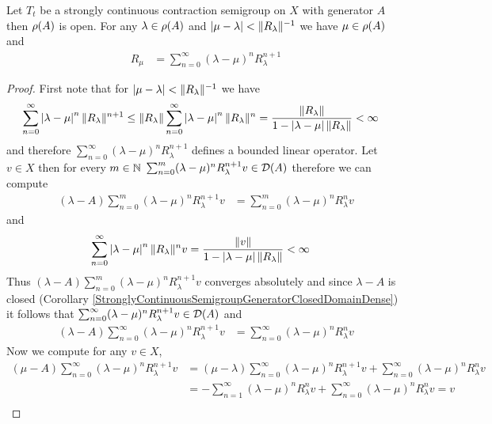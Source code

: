 \begin{prop}\label{SCCSResolventSetOpen}Let $T_t$ be a strongly continuous contraction semigroup on $X$ with generator $A$ then $\rho(A)$ is open.  For any $\lambda \in \rho(A)$ and 
$\left \vert \mu - \lambda \right \vert < \lVert R_\lambda \rVert^{-1}$ we have $\mu \in \rho(A)$ and 
\begin{align*}
R_\mu &= \sum_{n=0}^\infty (\lambda - \mu)^n R_\lambda^{n+1}
\end{align*}
\end{prop}
\begin{proof}
First note that for $\left \vert \mu - \lambda \right \vert < \lVert R_\lambda \rVert^{-1}$ we have
\begin{align*}
\sum_{n=0}^\infty \left \vert \lambda - \mu \right \vert^n \lVert R_\lambda \rVert^{n+1} 
&\leq \lVert R_\lambda \rVert \sum_{n=0}^\infty \left \vert \lambda - \mu \right \vert^n \lVert R_\lambda \rVert^{n} 
= \frac{\lVert R_\lambda \rVert}{1 - \left \vert \lambda - \mu \right \vert \lVert R_\lambda \rVert}
< \infty
\end{align*} 
and therefore $\sum_{n=0}^\infty (\lambda - \mu)^n R_\lambda^{n+1}$ defines a bounded linear operator.  Let $v \in X$ then for every $m \in \mathbb{N}$
$\sum_{n=0}^m  (\lambda - \mu)^n R_\lambda^{n+1} v \in \mathcal{D}(A)$ therefore we can compute
\begin{align*}
(\lambda - A) \sum_{n=0}^m  (\lambda - \mu)^n R_\lambda^{n+1} v
&= \sum_{n=0}^m  (\lambda - \mu)^n R_\lambda^{n} v
\end{align*}
and 
\begin{align*}
\sum_{n=0}^\infty \left \vert \lambda - \mu \right \vert^n \lVert R_\lambda \rVert^{n} v &= \frac{\lVert v \rVert}{1 - \left \vert \lambda - \mu \right \vert \lVert R_\lambda \rVert} < \infty
\end{align*}
Thus $(\lambda - A) \sum_{n=0}^m  (\lambda - \mu)^n R_\lambda^{n+1} v$ converges absolutely and since $\lambda -A$ is closed
(Corollary \ref{StronglyContinuousSemigroupGeneratorClosedDomainDense}) it follows that $\sum_{n=0}^\infty  (\lambda - \mu)^n R_\lambda^{n+1} v \in \mathcal{D}(A)$ and
\begin{align*}
(\lambda -A) \sum_{n=0}^\infty  (\lambda - \mu)^n R_\lambda^{n+1}v  &= \sum_{n=0}^\infty  (\lambda - \mu)^n R_\lambda^{n} v
\end{align*}
Now we compute for any $v \in X$,
\begin{align*}
(\mu - A) \sum_{n=0}^\infty  (\lambda - \mu)^n R_\lambda^{n+1} v
&= (\mu - \lambda) \sum_{n=0}^\infty  (\lambda - \mu)^n R_\lambda^{n+1} v + \sum_{n=0}^\infty  (\lambda - \mu)^n R_\lambda^{n} v\\
&= -\sum_{n=1}^\infty  (\lambda - \mu)^n R_\lambda^{n} v + \sum_{n=0}^\infty  (\lambda - \mu)^n R_\lambda^{n} v  = v\\

\end{align*}
\end{proof}
